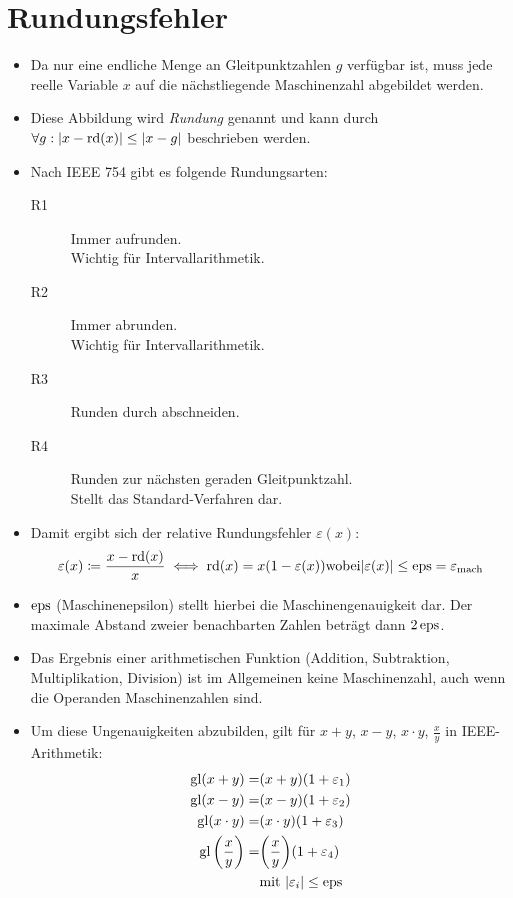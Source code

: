 	\section{Rundungsfehler} %
		\begin{itemize}
			\item Da nur eine endliche Menge an Gleitpunktzahlen \( g \) verfügbar ist, muss jede reelle Variable \( x \) auf die nächstliegende Maschinenzahl abgebildet werden.
			\item Diese Abbildung wird \textit{Rundung} genannt und kann durch \( \forall g : \abs{x - \operatorname{rd}(x)} \leq \abs{x - g} \) beschrieben werden.
			\item Nach IEEE 754 gibt es folgende Rundungsarten:
				\begin{description}
					\item[R1] Immer aufrunden. \\ Wichtig für Intervallarithmetik.
					\item[R2] Immer abrunden. \\ Wichtig für Intervallarithmetik.
					\item[R3] Runden durch abschneiden.
					\item[R4] Runden zur nächsten geraden Gleitpunktzahl. \\ Stellt das Standard-Verfahren dar.
				\end{description}
			\item Damit ergibt sich der relative Rundungsfehler \( \varepsilon(x) \):
				\begin{equation*}
					\varepsilon(x) \coloneqq \frac{x - \operatorname{rd}(x)}{x} \iff \operatorname{rd}(x) = x(1 - \varepsilon(x)) \text{wobei} \abs{\varepsilon(x)} \leq \operatorname{eps} = \varepsilon _ \text{mach}
				\end{equation*}
			\item \( \operatorname{eps} \) (Maschinenepsilon) stellt hierbei die Maschinengenauigkeit dar. Der maximale Abstand zweier benachbarten Zahlen beträgt dann \( 2\operatorname{eps} \).
			\item Das Ergebnis einer arithmetischen Funktion (Addition, Subtraktion, Multiplikation, Division) ist im Allgemeinen keine Maschinenzahl, auch wenn die Operanden Maschinenzahlen sind.
			\item Um diese Ungenauigkeiten abzubilden, gilt für \( x + y \), \( x - y \), \( x \cdot y \), \( \frac{x}{y} \) in IEEE-Arithmetik:
				\begin{align*}
					\operatorname{gl}(x + y)                        = & (x + y)(1 + \varepsilon _ 1)                 \\
					\operatorname{gl}(x - y)                        = & (x - y)(1 + \varepsilon _ 2)                 \\
					\operatorname{gl}(x \cdot y)                    = & (x \cdot y)(1 + \varepsilon _ 3)             \\
					\operatorname{gl}\bigg(\frac{x}{y}\bigg)        = & \bigg(\frac{x}{y}\bigg)(1 + \varepsilon _ 4) \\
					                                    & \text{mit } \abs{\varepsilon _ i} \leq \operatorname{eps}
				\end{align*}
		\end{itemize}

